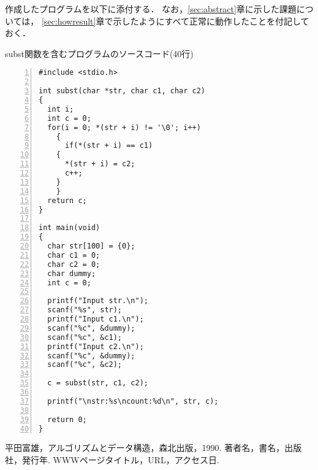 作成したプログラムを以下に添付する．
なお，\ref{sec:abstract}章に示した課題については，
\ref{sec:howresult}章で示したようにすべて正常に動作したことを付記しておく．

subst関数を含むプログラムのソースコード(40行)\label{func:subst}
\begin{Verbatim}[numbers=left, xleftmargin=10mm, numbersep=6pt,
                    fontsize=\small, baselinestretch=0.8]
#include <stdio.h>

int subst(char *str, char c1, char c2)
{
  int i;
  int c = 0;
  for(i = 0; *(str + i) != '\0'; i++)
    {
      if(*(str + i) == c1)
	{
	  *(str + i) = c2;
	  c++;
	}
    }
  return c;
}

int main(void)
{
  char str[100] = {0};
  char c1 = 0;
  char c2 = 0;
  char dummy;
  int c = 0; 

  printf("Input str.\n");
  scanf("%s", str);
  printf("Input c1.\n");
  scanf("%c", &dummy);
  scanf("%c", &c1);
  printf("Input c2.\n");
  scanf("%c", &dummy);
  scanf("%c", &c2);

  c = subst(str, c1, c2);
  
  printf("\nstr:%s\ncount:%d\n", str, c);

  return 0;
}
\end{Verbatim}


\begin{thebibliography}{99}
   平田富雄，アルゴリズムとデータ構造，森北出版，1990.
   著者名，書名，出版社，発行年.
   WWWページタイトル，URL，アクセス日.
\end{thebibliography}


